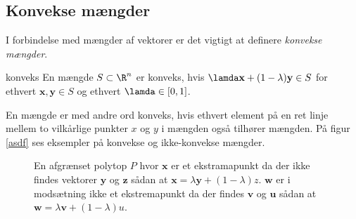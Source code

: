 \subsection{Konvekse mængder}
%
I forbindelse med mængder af vektorer er det vigtigt at definere \textit{konvekse mængder}.
\begin{defn}{}{konveks}
En mængde $S \subset \R^n$ er konveks, hvis $\lamda \textbf{x} + (1-\lambda )\textbf{y} \in S$ for ethvert $\textbf{x}, \textbf{y} \in S$ og ethvert $\lamda \in [0,1]$. 
\end{defn}
%
En mængde er med andre ord konveks, hvis ethvert element på en ret linje mellem to vilkårlige punkter $x$ og $y$ i mængden også tilhører mængden. På figur \ref{asdf} ses eksempler på konvekse og ikke-konvekse mængder. 

\begin{figure}[h!]
  \centering
  \caption{En afgrænset polytop $P$ hvor $\textbf{x}$ er et ekstramapunkt da der ikke findes vektorer $\textbf{y}$ og $\textbf{z}$ sådan at $\mathbf{x}=\lambda\mathbf{y}+(1-\lambda)z$. $\textbf{w}$ er i modsætning ikke et ekstremapunkt da der findes $\textbf{v}$ og $\textbf{u}$ sådan at $\mathbf{w}=\lambda\mathbf{v}+(1-\lambda)u$.}
  \label{fig:ekstrema}
\end{figure}
